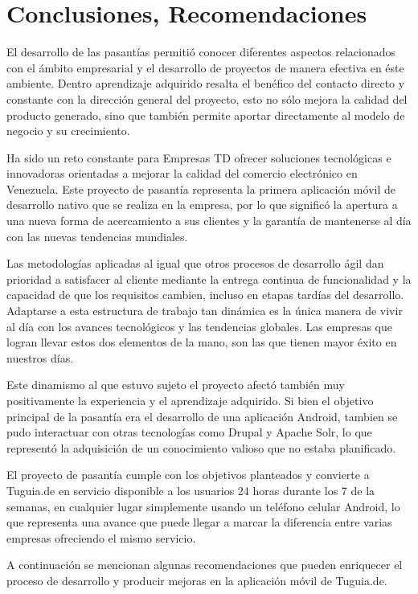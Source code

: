 \chapter{Conclusiones, Recomendaciones}

El desarrollo de las pasantías permitió conocer diferentes aspectos relacionados con el ámbito empresarial y el desarrollo de proyectos de manera efectiva en éste ambiente. Dentro aprendizaje adquirido resalta el benéfico del contacto directo y constante con la dirección general del proyecto, esto no sólo mejora la calidad del producto generado, sino que también permite aportar directamente al modelo de negocio y su crecimiento. 

Ha sido un reto constante para Empresas TD ofrecer soluciones tecnológicas e innovadoras orientadas a mejorar la calidad del comercio electrónico en Venezuela. Este proyecto de pasantía representa la primera aplicación móvil de desarrollo nativo que se realiza en la empresa, por lo que significó la apertura a una nueva forma de acercamiento a sus clientes y la garantía de mantenerse al día con las nuevas tendencias mundiales.

Las metodologías aplicadas al igual que otros procesos de desarrollo ágil dan prioridad a  satisfacer al cliente mediante la entrega continua de funcionalidad y la capacidad de que los requisitos cambien, incluso en etapas tardías del desarrollo. Adaptarse a esta estructura de trabajo tan dinámica es la única manera de vivir al día con los avances tecnológicos y las tendencias globales. Las empresas que logran llevar estos dos elementos de la mano, son las que tienen mayor éxito en nuestros días. 

Este dinamismo al que estuvo sujeto el proyecto afectó también muy positivamente la experiencia y el aprendizaje adquirido. Si bien el objetivo principal de la pasantía era el desarrollo de una aplicación Android, tambien se pudo interactuar con otras tecnologías como Drupal y Apache Solr, lo que representó la adquisición de un conocimiento valioso que no estaba planificado.

El proyecto de pasantía cumple con los objetivos planteados y convierte a Tuguia.de en servicio disponible a los usuarios 24 horas durante los 7 de la semanas, en cualquier lugar simplemente usando un teléfono celular Android, lo que representa una avance que puede llegar a marcar la diferencia entre varias empresas ofreciendo el mismo servicio.

A continuación se mencionan algunas recomendaciones que pueden enriquecer el proceso de desarrollo y producir mejoras en la aplicación móvil de Tuguia.de.
 
